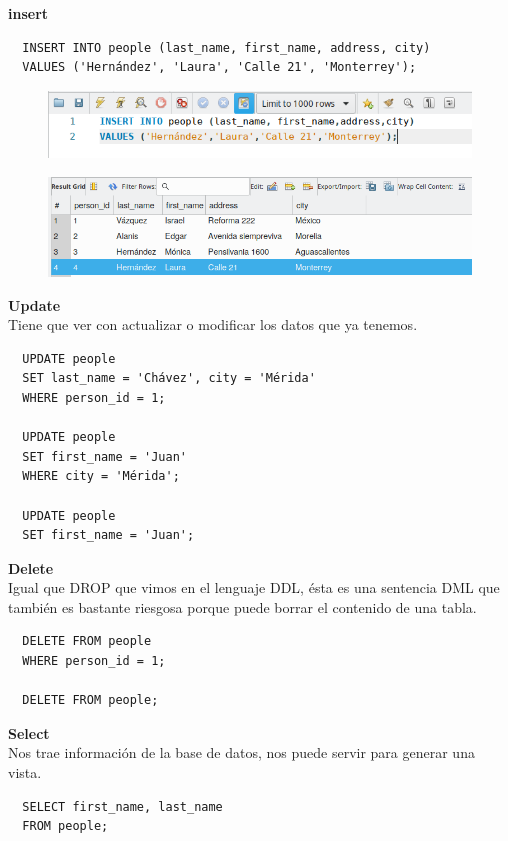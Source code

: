 \documentclass{article}
\begin{document}
\textbf{insert}
\begin{verbatim}
  INSERT INTO people (last_name, first_name, address, city)
  VALUES ('Hernández', 'Laura', 'Calle 21', 'Monterrey');
\end{verbatim}

\begin{figure}[h!]
  \centering
  \includegraphics[scale=0.75]{./Pictures/062_insert.png}
\end{figure}

\begin{figure}[h!]
  \centering
  \includegraphics[scale=0.75]{./Pictures/063_insert.png}
\end{figure}

\textbf{Update}\\
Tiene que ver con actualizar o modificar los datos que ya tenemos.
\begin{verbatim}
  UPDATE people
  SET last_name = 'Chávez', city = 'Mérida'
  WHERE person_id = 1;

  UPDATE people
  SET first_name = 'Juan'
  WHERE city = 'Mérida';

  UPDATE people
  SET first_name = 'Juan';
\end{verbatim}

\textbf{Delete}\\
Igual que DROP que vimos en el lenguaje DDL, ésta es una sentencia DML que
también es bastante riesgosa porque puede borrar el contenido de una tabla.

\begin{verbatim}
  DELETE FROM people
  WHERE person_id = 1;

  DELETE FROM people;
\end{verbatim}

\textbf{Select}\\
Nos trae información de la base de datos, nos puede servir para generar una
vista.
\begin{verbatim}
  SELECT first_name, last_name
  FROM people;
\end{verbatim}
\end{document}
